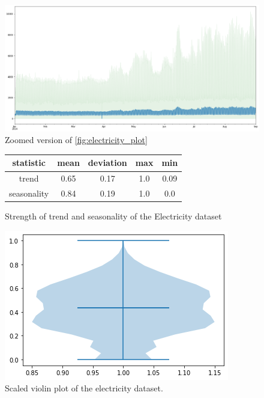 \begin{figure}[htb]
    \centering
      \includegraphics[width=\linewidth]{2_background/figures/electricity_no_negative.png}
      \caption{Zoomed version of \ref{fig:electricity_plot}}
      \label{fig:electricity_plot_zooomed}
    \endminipage\hfill
\end{figure}

\begin{figure}[htb]
    \centering
        \begin{center}
            \begin{tabular}{||c | c | c | c | c |} 
                \hline
                statistic & mean & deviation & max & min\\
                \hline
                trend & 0.65 & 0.17 & 1.0 & 0.09 \\
                \hline
                seasonality & 0.84 & 0.19 & 1.0 & 0.0 \\
                \hline
                \hline
            \end{tabular}
            \caption{Strength of trend and seasonality of the Electricity dataset}
        \end{center}
    \endminipage\hfill
      \includegraphics[width=\linewidth]{4_designing/figures/electricity_violin.png}
      \caption{Scaled violin plot of the electricity dataset.}
      \label{fig:electricity_violin}
    \endminipage\hfill
\end{figure}

